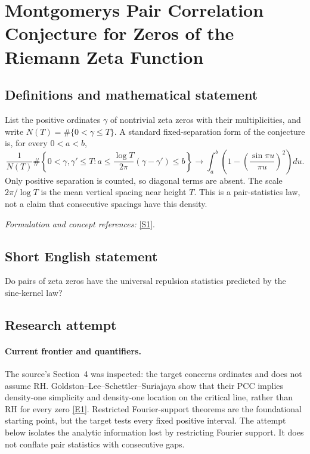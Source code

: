 \documentclass[11pt,a4paper]{article}
\numberwithin{equation}{section}
\newcommand{\sref}[2]{\hyperlink{source:#1:#2}{[S#2]}}
\newcommand{\eref}[2]{\hyperlink{extra:#1:#2}{[E#2]}}
\newif\ifshowcatalogue
\newcommand{\cataloguescope}[1]{\ifshowcatalogue
 \paragraph{Exact scope in the supplied catalogue.}
 \begin{quote}\small #1\end{quote}\fi}
\begin{document}
\setcounter{section}{73}
\section{\texorpdfstring{Montgomerys Pair Correlation Conjecture for Zeros of the Riemann Zeta Function}{Montgomerys Pair Correlation Conjecture for Zeros of the Riemann Zeta Function}}\label{74}
\subsection{Definitions and mathematical statement}
List the positive ordinates $\gamma$ of nontrivial zeta zeros with their multiplicities, and write $N(T)=\#\{0<\gamma\le T\}$. A standard fixed-separation form of the conjecture is, for every $0<a<b$,
\[
 \frac{1}{N(T)}\#\left\{0<\gamma,\gamma'\le T:
 a\le\frac{\log T}{2\pi}(\gamma-\gamma')\le b\right\}
 \longrightarrow\int_a^b\left(1-\left(\frac{\sin\pi u}{\pi u}\right)^2\right)du.
\]
Only positive separation is counted, so diagonal terms are absent. The scale $2\pi/\log T$ is the mean vertical spacing near height $T$. This is a pair-statistics law, not a claim that consecutive spacings have this density.
\par\smallskip\textit{Formulation and concept references:} \sref{74}{1}.
\cataloguescope{Prove that normalized vertical gaps between pairs of nontrivial zeros of the Riemann zeta function have limiting pair density 1 - (sin(pi u)/(pi u))\textasciicircum{}2 at fixed positive normalized separation.}
\subsection{Short English statement}
Do pairs of zeta zeros have the universal repulsion statistics predicted by the sine-kernel law?
\subsection{Research attempt}

\paragraph{Current frontier and quantifiers.}
The source's Section~4 was inspected: the target concerns ordinates and does
not assume RH. Goldston--Lee--Schettler--Suriajaya show that their PCC
implies density-one simplicity and density-one location on the critical
line, rather than RH for every zero \eref{74}{1}.
Restricted Fourier-support theorems are the foundational starting point,
but the target tests every fixed positive interval. The attempt below
isolates the analytic information lost by restricting Fourier support.
It does not conflate pair statistics with consecutive gaps.
\end{document}

